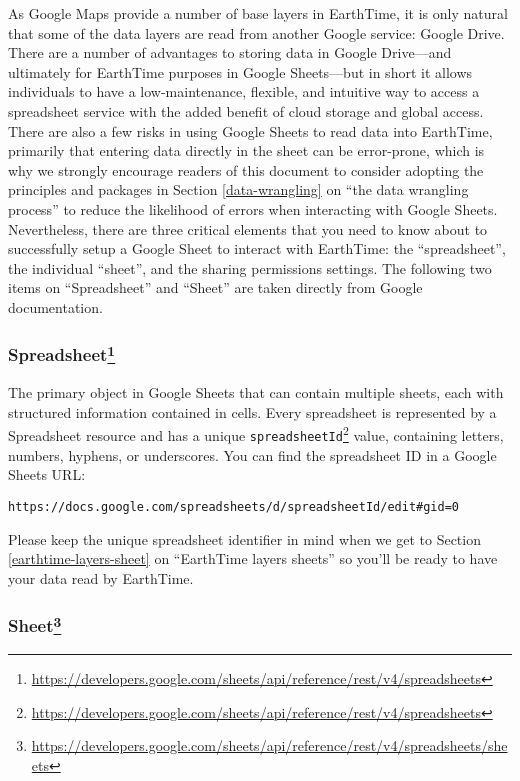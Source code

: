 \documentclass[
  12pt,
]{krantz}
\renewcommand{\href}[2]{#2\footnote{\url{#1}}}
\begin{document}
As Google Maps provide a number of base layers in EarthTime, it is only natural that some of the data layers are read from another Google service: Google Drive. There are a number of advantages to storing data in Google Drive---and ultimately for EarthTime purposes in Google Sheets---but in short it allows individuals to have a low-maintenance, flexible, and intuitive way to access a spreadsheet service with the added benefit of cloud storage and global access. There are also a few risks in using Google Sheets to read data into EarthTime, primarily that entering data directly in the sheet can be error-prone, which is why we strongly encourage readers of this document to consider adopting the principles and packages in Section \ref{data-wrangling} on ``the data wrangling process'' to reduce the likelihood of errors when interacting with Google Sheets. Nevertheless, there are three critical elements that you need to know about to successfully setup a Google Sheet to interact with EarthTime: the ``spreadsheet'', the individual ``sheet'', and the sharing permissions settings. The following two items on ``Spreadsheet'' and ``Sheet'' are taken directly from Google documentation.

\hypertarget{spreadsheet}{%
\subsubsection*{\texorpdfstring{\href{https://developers.google.com/sheets/api/reference/rest/v4/spreadsheets}{Spreadsheet}}{Spreadsheet}}\label{spreadsheet}}


The primary object in Google Sheets that can contain multiple sheets, each with structured information contained in cells. Every spreadsheet is represented by a Spreadsheet resource and has a unique \href{https://developers.google.com/sheets/api/reference/rest/v4/spreadsheets}{\texttt{spreadsheetId}} value, containing letters, numbers, hyphens, or underscores. You can find the spreadsheet ID in a Google Sheets URL:

\texttt{https://docs.google.com/spreadsheets/d/spreadsheetId/edit\#gid=0}

Please keep the unique spreadsheet identifier in mind when we get to Section \ref{earthtime-layers-sheet} on ``EarthTime layers sheets'' so you'll be ready to have your data read by EarthTime.

\hypertarget{sheet}{%
\subsubsection*{\texorpdfstring{\href{https://developers.google.com/sheets/api/reference/rest/v4/spreadsheets/sheets}{Sheet}}{Sheet}}\label{sheet}}
\end{document}
